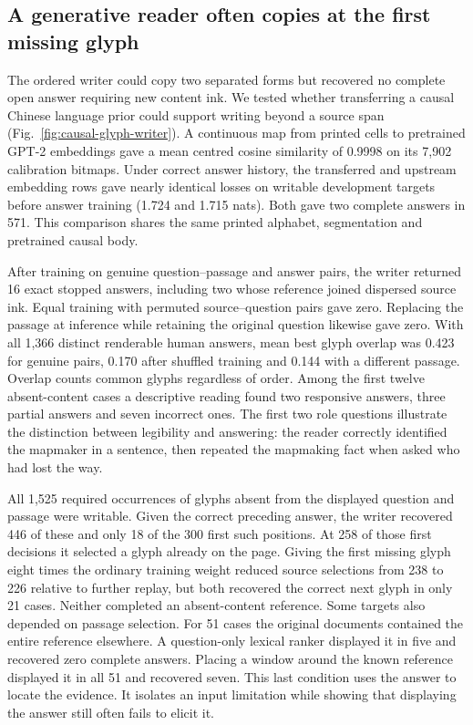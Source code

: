 \subsection*{A generative reader often copies at the first missing glyph}
The ordered writer could copy two separated forms but recovered no complete open answer requiring new content ink. We tested whether transferring a causal Chinese language prior could support writing beyond a source span (Fig.~\ref{fig:causal-glyph-writer}). A continuous map from printed cells to pretrained GPT-2 embeddings gave a mean centred cosine similarity of 0.9998 on its 7,902 calibration bitmaps. Under correct answer history, the transferred and upstream embedding rows gave nearly identical losses on writable development targets before answer training (1.724 and 1.715 nats). Both gave two complete answers in 571. This comparison shares the same printed alphabet, segmentation and pretrained causal body.

After training on genuine question--passage and answer pairs, the writer returned 16 exact stopped answers, including two whose reference joined dispersed source ink. Equal training with permuted source--question pairs gave zero. Replacing the passage at inference while retaining the original question likewise gave zero. With all 1,366 distinct renderable human answers, mean best glyph overlap was 0.423 for genuine pairs, 0.170 after shuffled training and 0.144 with a different passage. Overlap counts common glyphs regardless of order. Among the first twelve absent-content cases a descriptive reading found two responsive answers, three partial answers and seven incorrect ones. The first two role questions illustrate the distinction between legibility and answering: the reader correctly identified the mapmaker in a sentence, then repeated the mapmaking fact when asked who had lost the way.

All 1,525 required occurrences of glyphs absent from the displayed question and passage were writable. Given the correct preceding answer, the writer recovered 446 of these and only 18 of the 300 first such positions. At 258 of those first decisions it selected a glyph already on the page. Giving the first missing glyph eight times the ordinary training weight reduced source selections from 238 to 226 relative to further replay, but both recovered the correct next glyph in only 21 cases. Neither completed an absent-content reference. Some targets also depended on passage selection. For 51 cases the original documents contained the entire reference elsewhere. A question-only lexical ranker displayed it in five and recovered zero complete answers. Placing a window around the known reference displayed it in all 51 and recovered seven. This last condition uses the answer to locate the evidence. It isolates an input limitation while showing that displaying the answer still often fails to elicit it.
